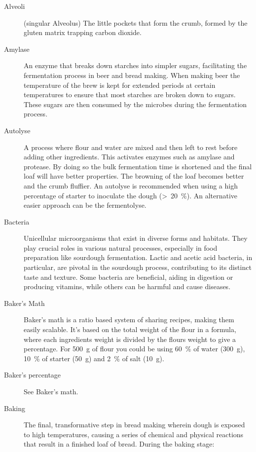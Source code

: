 \begin{description}
\item[Alveoli] (singular Alveolus) The little pockets that form the crumb,
formed by the gluten matrix trapping carbon dioxide.

\item[Amylase] An enzyme that breaks down starches into simpler sugars, facilitating
the fermentation process in beer and bread making. When making beer the temperature
of the brew is kept for extended periods at certain temperatures to ensure that most
starches are broken down to sugars. These sugars are then consumed by the microbes
during the fermentation process.

\item[Autolyse] A process where flour and water are mixed and then left to rest
before adding other ingredients. This activates enzymes such as amylase and protease.
By doing so the bulk fermentation time is shortened and the final loaf will have
better properties. The browning of the loaf becomes better and the crumb fluffier.
An autolyse is recommended when using a high percentage of starter to inoculate the
dough (>~\SI{20}{\percent}). An alternative easier approach can be the fermentolyse.

\item[Bacteria] Unicellular microorganisms that exist in diverse forms and
habitats. They play crucial roles in various natural processes, especially in food
preparation like sourdough fermentation. Lactic and acetic acid bacteria, in particular,
are pivotal in the sourdough process, contributing to its distinct taste and texture.
Some bacteria are beneficial, aiding in digestion or producing vitamins, while others
can be harmful and cause diseases.

\item[Baker’s Math] Baker’s math is a ratio based system of sharing recipes,
making them easily scalable. It’s based on the total weight of the flour in a formula,
where each ingredients weight is divided by the flours weight to give a percentage.
For \SI{500}{\gram} of flour you could be using \SI{60}{\percent} of water (\SI{300}{\gram}),
\SI{10}{\percent} of starter (\SI{50}{\gram}) and \SI{2}{\percent} of salt (\SI{10}{\gram}).

\item[Baker’s percentage] See Baker’s math.

\item[Baking] The final, transformative step in bread making wherein dough is
exposed to high temperatures, causing a series of chemical and physical reactions
that result in a finished loaf of bread. During the baking stage:


\end{description}

